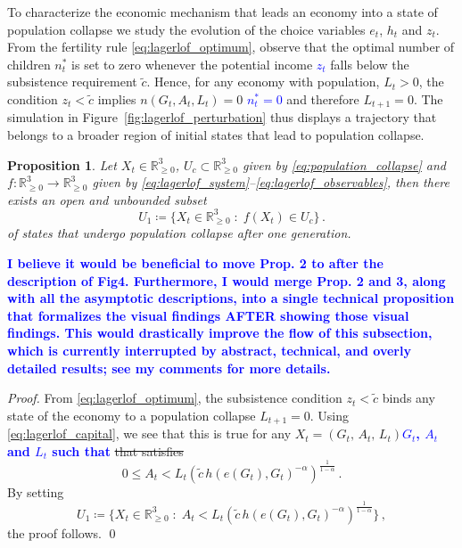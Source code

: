 \documentclass[a4paper,fleqn]{cas-sc}
\newtheorem{proposition}{Proposition}
\newcommand{\samb}[1]{\textcolor{blue}{\textbf{#1}}}
\begin{document}
To characterize the economic mechanism that leads an economy into a state of population collapse we study the evolution of the choice variables $e_t$, $h_t$ and $z_t$. 
From the fertility rule \eqref{eq:lagerlof_optimum}, observe that the optimal number of children $n^*_t$ is set to zero whenever the potential income \samb{$z_t$} falls below the subsistence requirement $\tilde c$. 
Hence, for any economy with population, $L_t>0$, the condition \(z_t<\tilde c \) implies \sout{${n(G_t,A_t,L_t)=0}$} \samb{$n_t^*=0$} and therefore $L_{t+1}=0$.
The simulation in Figure~\ref{fig:lagerlof_perturbation} thus displays a trajectory that belongs to a broader region of initial states that lead to population collapse.
%
\begin{proposition}\label{prop:population_collapse_1}
     Let $X_t\in \mathbb{R}^3_{\geq0}$, $U_c\subset\mathbb{R}^3_{\geq0}$ given by \eqref{eq:population_collapse} and $f:\mathbb{R}^3_{\geq0}\to \mathbb{R}^3_{\geq0}$ given by \eqref{eq:lagerlof_system}--\eqref{eq:lagerlof_observables}, then there exists an open and unbounded subset
     \begin{equation}\label{eq:set_population_collapse_1}
         U_1\coloneqq\{X_t\in\mathbb{R}^3_{\geq0}\;:\; f(X_t)\in U_c\}\,.
     \end{equation}
     of states that undergo population collapse after one generation.
\end{proposition}
%
\samb{I believe it would be beneficial to move Prop. 2 to after the description of Fig4. Furthermore, I would merge Prop. 2 and 3, along with all the asymptotic descriptions, into a single technical proposition that formalizes the visual findings AFTER showing those visual findings. This would drastically improve the flow of this subsection, which is currently interrupted by abstract, technical, and overly detailed results; see my comments for more details.}
\begin{proof}
     From \eqref{eq:lagerlof_optimum}, the subsistence condition $z_t<\tilde{c}$ binds any state of the economy to a population collapse $L_{t+1} = 0$.
     Using \eqref{eq:lagerlof_capital}, we see that this is true for any \sout{$X_t=(G_t,\,A_t,\,L_t)$}\samb{$G_t$, $A_t$ and $L_t$ such that} \sout{that satisfies}
     \begin{equation}\label{eq:population_collapse_1}
         0\leq A_t<L_t(\tilde{c}\,h(e(G_t),G_t)^{-\alpha})^{\frac{1}{{1-\alpha}}}\,.    
     \end{equation}
     By setting 
     \begin{equation*}
         U_1\coloneqq\Big\{X_t\in\mathbb{R}^3_{\geq0}\;:\;A_t<L_t(\tilde{c}\,h(e(G_t),G_t)^{-\alpha})^{\frac{1}{1-\alpha}}\Big\}\,,
     \end{equation*}
     the proof follows.
     \qed
\end{proof}
\end{document}
